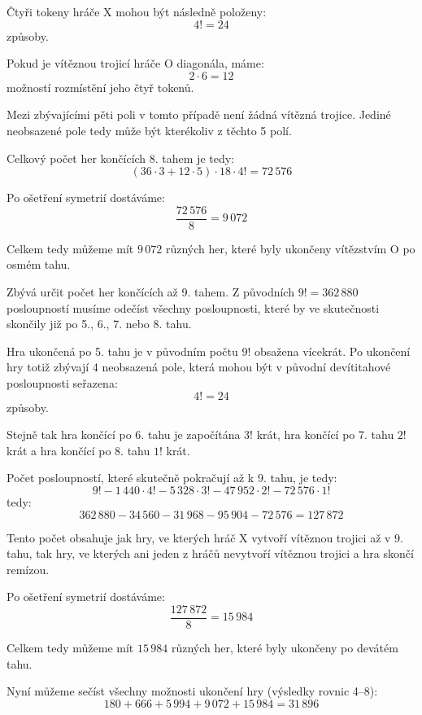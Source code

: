 \documentclass[12pt,a4paper]{article}
\begin{document}
Čtyři tokeny hráče $\mathrm{X}$ mohou být následně položeny:
\[
    4! = 24
\]
způsoby.

Pokud je vítěznou trojicí hráče $\mathrm{O}$ diagonála, máme:
\[
    2\cdot6 = 12
\]
možností rozmístění jeho čtyř tokenů.

Mezi zbývajícími pěti poli v tomto případě není žádná vítězná trojice. 
Jediné neobsazené pole tedy může být kterékoliv z těchto 5 polí.

Celkový počet her končících 8. tahem je tedy:
\[
    \left(36\cdot3+12\cdot5\right)\cdot18\cdot4! = 72\,576
\]

Po ošetření symetrií dostáváme:
\begin{equation}
    \frac{72\,576}{8} = 9\,072
\end{equation}

Celkem tedy můžeme mít $9\,072$ různých her, 
které byly ukončeny vítězstvím $\mathrm{O}$ po osmém tahu.

Zbývá určit počet her končících až 9. tahem.
Z původních $9! = 362\,880$ posloupností musíme odečíst všechny posloupnosti, 
které by ve skutečnosti skončily již po 5., 6., 7. nebo 8. tahu.

Hra ukončená po 5. tahu je v původním počtu $9!$ obsažena vícekrát.
Po ukončení hry totiž zbývají 4 neobsazená pole, 
která mohou být v původní devítitahové posloupnosti seřazena:
\[
    4! = 24
\]
způsoby.

Stejně tak hra končící po 6. tahu je započítána $3!$ krát, 
hra končící po 7. tahu $2!$ krát a hra končící po 8. tahu $1!$ krát.

Počet posloupností, které skutečně pokračují až k 9. tahu, je tedy:
\[
    9!-1\,440\cdot4!-5\,328\cdot3!-47\,952\cdot2!-72\,576\cdot1!
\]
tedy:
\[
    362\,880-34\,560-31\,968-95\,904-72\,576 = 127\,872
\]

Tento počet obsahuje jak hry, ve kterých hráč $\mathrm{X}$ vytvoří vítěznou trojici až v 9. tahu,
 tak hry, ve kterých ani jeden z hráčů nevytvoří vítěznou trojici a hra skončí remízou.

Po ošetření symetrií dostáváme:
\begin{equation}
    \frac{127\,872}{8} = 15\,984
\end{equation}

Celkem tedy můžeme mít $15\,984$ různých her, které byly ukončeny po devátém tahu.

Nyní můžeme sečíst všechny možnosti ukončení hry (výsledky rovnic 4--8):
\[
    180+666+5\,994+9\,072+15\,984 = 31\,896
\]
\end{document}
